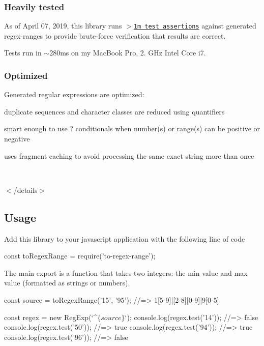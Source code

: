 \subsubsection*{Heavily tested}

As of April 07, 2019, this library runs \href{./test/test.js}{\tt $>$1m test assertions} against generated regex-\/ranges to provide brute-\/force verification that results are correct.

Tests run in $\sim$280ms on my Mac\+Book Pro, 2. G\+Hz Intel Core i7.

\subsubsection*{Optimized}

Generated regular expressions are optimized\+:


\begin{DoxyItemize}
\item duplicate sequences and character classes are reduced using quantifiers
\item smart enough to use {\ttfamily ?} conditionals when number(s) or range(s) can be positive or negative
\item uses fragment caching to avoid processing the same exact string more than once
\end{DoxyItemize}

~\newline


$<$/details$>$

\subsection*{Usage}

Add this library to your javascript application with the following line of code


\begin{DoxyCode}
const toRegexRange = require('to-regex-range');
\end{DoxyCode}


The main export is a function that takes two integers\+: the {\ttfamily min} value and {\ttfamily max} value (formatted as strings or numbers).


\begin{DoxyCode}
const source = toRegexRange('15', '95');
//=> 1[5-9]|[2-8][0-9]|9[0-5]

const regex = new RegExp(`^$\{source\}$`);
console.log(regex.test('14')); //=> false
console.log(regex.test('50')); //=> true
console.log(regex.test('94')); //=> true
console.log(regex.test('96')); //=> false
\end{DoxyCode}


